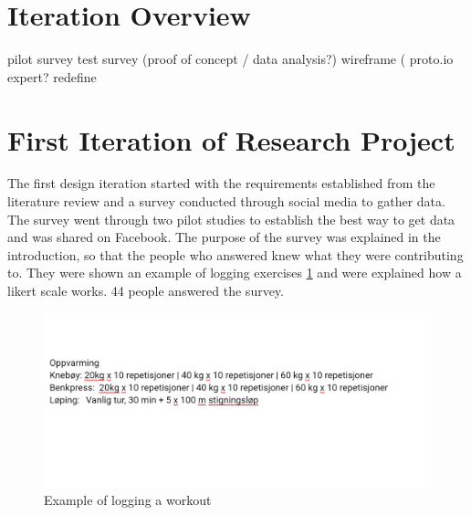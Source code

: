 \section{Iteration Overview}
pilot survey test 
survey (proof of concept / data analysis?)
wireframe ( proto.io
expert?
redefine
\section{First Iteration of Research Project}
The first design iteration started with the requirements established from the literature review and a survey conducted through social media to gather data. The survey went through two pilot studies to establish the best way to get data and was shared on Facebook. The purpose of the survey was explained in the introduction, so that the people who answered knew what they were contributing to. They were shown an example of logging exercises \ref{fig:workout log} and were explained how a likert scale works. 44 people answered the survey.
\begin{figure}[H]
    \centering
    \includegraphics[width=120mm]{figures/testtest.png}
    \caption{Example of logging a workout}
    \label{fig:workout log}
\end{figure}
